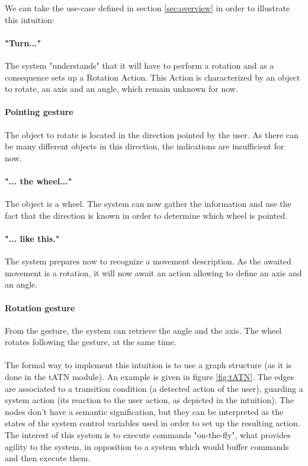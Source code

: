 \documentclass[a4paper]{article}
\begin{document}
We can take the use-case defined in section \ref{sec:overview} in order to illustrate this intuition:

\paragraph{"Turn..."} The system "understands" that it will have to perform a rotation and as a consequence sets up a Rotation Action. This Action is characterized by an object to rotate, an axis and an angle, which remain unknown for now.

\paragraph{Pointing gesture} The object to rotate is located in the direction pointed by the user. As there can be many different objects in this direction, the indications are insufficient for now.

\paragraph{"... the wheel..."} The object is a wheel. The system can now gather the information and use the fact that the direction is known in order to determine which wheel is pointed.

\paragraph{"... like this."} The system prepares now to recognize a movement description. As the awaited movement is a rotation, it will now await an action allowing to define an axis and an angle.

\paragraph{Rotation gesture} From the gesture, the system can retrieve the angle and the axis. The wheel rotates following the gesture, at the same time.
\\
\\
The formal way to implement this intuition is to use a graph structure (as it is done in the tATN module). An example is given in figure \ref{fig:tATN}. The edges are associated to a transition condition (a detected action of the user), guarding a system action (its reaction to the user action, as depicted in the intuition). The nodes don't have a semantic signification, but they can be interpreted as the states of the system control variables used in order to set up the resulting action. The interest of this system is to execute commands "on-the-fly", what provides agility to the system, in opposition to a system which would buffer commands and then execute them.
\end{document}
